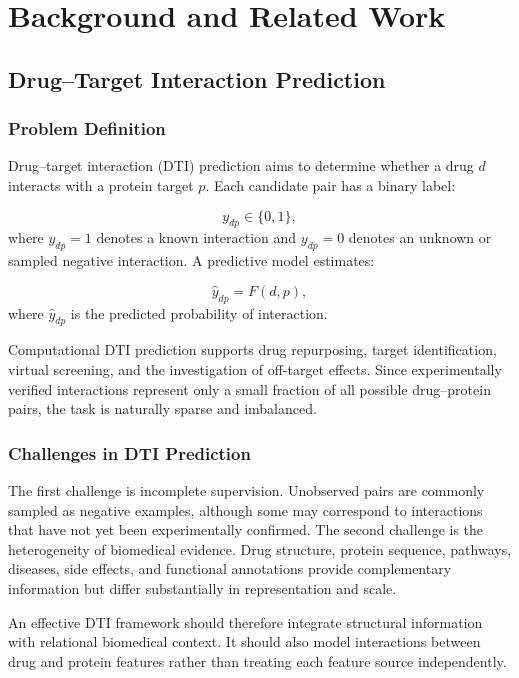 \chapter{Background and Related Work}
\label{chap:background_related_work}

\section{Drug--Target Interaction Prediction}

\subsection{Problem Definition}

Drug--target interaction (DTI) prediction aims to determine whether a drug
$d$ interacts with a protein target $p$. Each candidate pair has a binary
label:

\begin{equation}
    y_{dp} \in \{0,1\},
\end{equation}
where $y_{dp}=1$ denotes a known interaction and $y_{dp}=0$ denotes an unknown
or sampled negative interaction. A predictive model estimates:

\begin{equation}
    \hat{y}_{dp}=F(d,p),
\end{equation}
where $\hat{y}_{dp}$ is the predicted probability of interaction.

Computational DTI prediction supports drug repurposing, target identification,
virtual screening, and the investigation of off-target effects. Since
experimentally verified interactions represent only a small fraction of all
possible drug--protein pairs, the task is naturally sparse and imbalanced.

\subsection{Challenges in DTI Prediction}

The first challenge is incomplete supervision. Unobserved pairs are commonly
sampled as negative examples, although some may correspond to interactions
that have not yet been experimentally confirmed. The second challenge is the
heterogeneity of biomedical evidence. Drug structure, protein sequence,
pathways, diseases, side effects, and functional annotations provide
complementary information but differ substantially in representation and
scale.

An effective DTI framework should therefore integrate structural information
with relational biomedical context. It should also model interactions between
drug and protein features rather than treating each feature source
independently.


